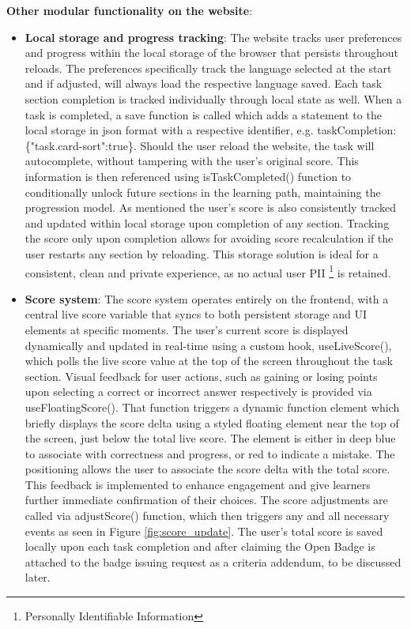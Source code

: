 \textbf{Other modular functionality on the website}:
\begin{itemize}
    \item \textbf{Local storage and progress tracking}: The website tracks user preferences and progress within the local storage of the browser that persists throughout reloads. 
    The preferences specifically track the language selected at the start and if adjusted, will always load the respective language saved.
    Each task section completion is tracked individually through local state as well.
    When a task is completed, a save function is called which adds a statement to the local storage in \acrshort{json} format with a respective identifier, e.g. taskCompletion: \{"task.card-sort":true\}. 
    Should the user reload the website, the task will autocomplete, without tampering with the user's original score.
    This information is then referenced using isTaskCompleted() function to conditionally unlock future sections in the learning path, maintaining the progression model. 
    As mentioned the user's score is also consistently tracked and updated within local storage upon completion of any section.
    Tracking the score only upon completion allows for avoiding score recalculation if the user restarts any section by reloading. 
    This storage solution is ideal for a consistent, clean and private experience, as no actual user PII \footnote{Personally Identifiable Information} is retained.
    \item \textbf{Score system}: The score system operates entirely on the frontend, with a central live score variable that syncs to both persistent storage and UI elements at specific moments. 
    The user’s current score is displayed dynamically and updated in real-time using a custom hook, useLiveScore(), which polls the live score value at the top of the screen throughout the task section. 
    Visual feedback for user actions, such as gaining or losing points upon selecting a correct or incorrect answer respectively is provided via useFloatingScore(). 
    That function triggers a dynamic function element which briefly displays the score delta using a styled floating element near the top of the screen, just below the total live score. 
    The element is either in deep blue to associate with correctness and progress, or red to indicate a mistake.
    The positioning allows the user to associate the score delta with the total score. 
    This feedback is implemented to enhance engagement and give learners further immediate confirmation of their choices.
    The score adjustments are called via adjustScore() function, which then triggers any and all necessary events as seen in Figure \ref{fig:score_update}.
    The user's total score is saved locally upon each task completion and after claiming the Open Badge is attached to the badge issuing request as a criteria addendum, to be discussed later.
    

\end{itemize}
